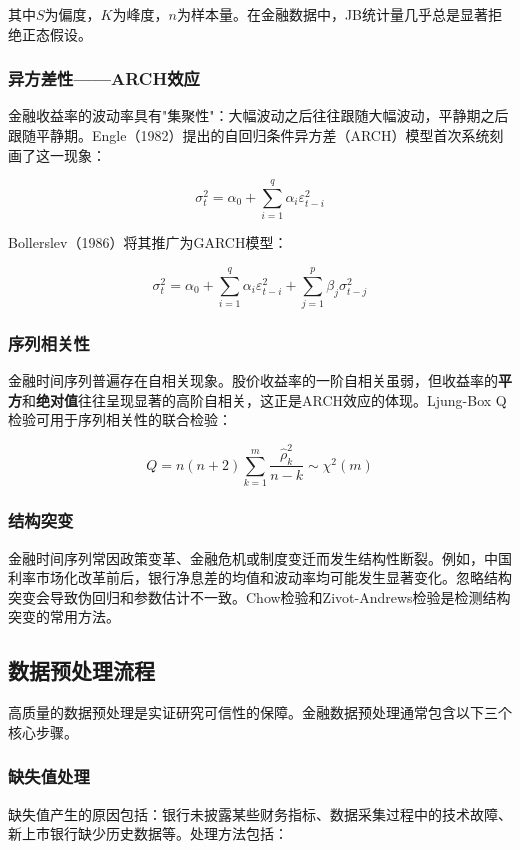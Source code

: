 其中$S$为偏度，$K$为峰度，$n$为样本量。在金融数据中，JB统计量几乎总是显著拒绝正态假设。

\subsubsection{异方差性——ARCH效应}

金融收益率的波动率具有"集聚性"：大幅波动之后往往跟随大幅波动，平静期之后跟随平静期。Engle（1982）提出的自回归条件异方差（ARCH）模型首次系统刻画了这一现象：

\[
\sigma_t^2 = \alpha_0 + \sum_{i=1}^{q} \alpha_i \varepsilon_{t-i}^2
\]

Bollerslev（1986）将其推广为GARCH模型：

\[
\sigma_t^2 = \alpha_0 + \sum_{i=1}^{q} \alpha_i \varepsilon_{t-i}^2 + \sum_{j=1}^{p} \beta_j \sigma_{t-j}^2
\]

\subsubsection{序列相关性}

金融时间序列普遍存在自相关现象。股价收益率的一阶自相关虽弱，但收益率的\textbf{平方}和\textbf{绝对值}往往呈现显著的高阶自相关，这正是ARCH效应的体现。Ljung-Box Q检验可用于序列相关性的联合检验：

\[
Q = n(n+2)\sum_{k=1}^{m}\frac{\hat{\rho}_k^2}{n-k} \sim \chi^2(m)
\]

\subsubsection{结构突变}

金融时间序列常因政策变革、金融危机或制度变迁而发生结构性断裂。例如，中国利率市场化改革前后，银行净息差的均值和波动率均可能发生显著变化。忽略结构突变会导致伪回归和参数估计不一致。Chow检验和Zivot-Andrews检验是检测结构突变的常用方法。

\subsection{数据预处理流程}

高质量的数据预处理是实证研究可信性的保障。金融数据预处理通常包含以下三个核心步骤。

\subsubsection{缺失值处理}

缺失值产生的原因包括：银行未披露某些财务指标、数据采集过程中的技术故障、新上市银行缺少历史数据等。处理方法包括：


